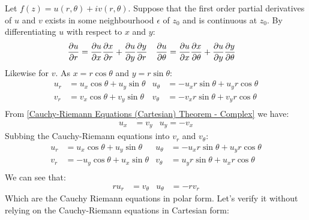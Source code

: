 \documentclass[12pt, english]{book}
\makeatletter
\renewenvironment{proof}[1][\proofname]{\par
	\pushQED{\qed}%
	\normalfont \topsep6\p@\@plus6\p@\relax
	\list{}{%
		\settowidth{\leftmargin}{\itshape\proofname:\hskip\labelsep}%
		\setlength{\labelwidth}{0pt}%
		\setlength{\itemindent}{-\leftmargin}%
		}%
	\item[\hskip\labelsep\itshape#1\@addpunct{:}]\ignorespaces
	}{\popQED\endlist\@endpefalse}
\makeatother
\begin{document}
	\begin{proof}
		Let \(f(z) = u(r,\theta) + iv(r,\theta)\). Suppose that the first order partial derivatives of \(u\) and \(v\) exists in some neighbourhood \(\epsilon \) of \(z_0\) and is continuous at \(z_0\). By differentiating \(u\) with respect to \(x\) and \(y\):
		\begin{align*}
			\pdv{u}{r} &= \pdv{u}{x} \pdv{x}{r} + \pdv{u}{y}\pdv{y}{r} &
			\pdv{u}{\theta} &= \pdv{u}{x} \pdv{x}{\theta} + \pdv{u}{y}\pdv{y}{\theta} 
		\end{align*}
		Likewise for \(v\). As \(x = r \cos\theta \) and \(y = r\sin \theta\):
		\begin{align*}
			u_r &= u_x \cos \theta + u_y \sin \theta 
				&	u_\theta &= -u_x r \sin \theta + u_y r \cos \theta \\
			v_r &= v_x \cos \theta + v_y \sin \theta 
			&	v_\theta &= -v_x r \sin \theta + v_y r \cos \theta \\
		\end{align*}
		From \cref{Cauchy-Riemann Equations (Cartesian) Theorem - Complex} we have: 
		\begin{align*}
			u_x &= v_y	&	u_y = -v_x
		\end{align*}
		Subbing the Cauchy-Riemann equations into \(v_r\) and \(v_\theta\):
		\begin{align*}
			u_r &= u_x \cos \theta + u_y \sin \theta 
			&	u_\theta &= -u_x r \sin \theta + u_y r \cos \theta \\
			v_r &= -u_y \cos \theta + u_x \sin \theta 
			&	v_\theta &= u_y r \sin \theta + u_x r \cos \theta \\
		\end{align*}
		We can see that: 
		\begin{align*}
			ru_r &= v_\theta 	&	u_\theta &= -rv_r
		\end{align*}
		Which are the Cauchy Riemann equations in polar form. Let's verify it without relying on the Cauchy-Riemann equations in Cartesian form: 
		

\end{proof}
\end{document}
